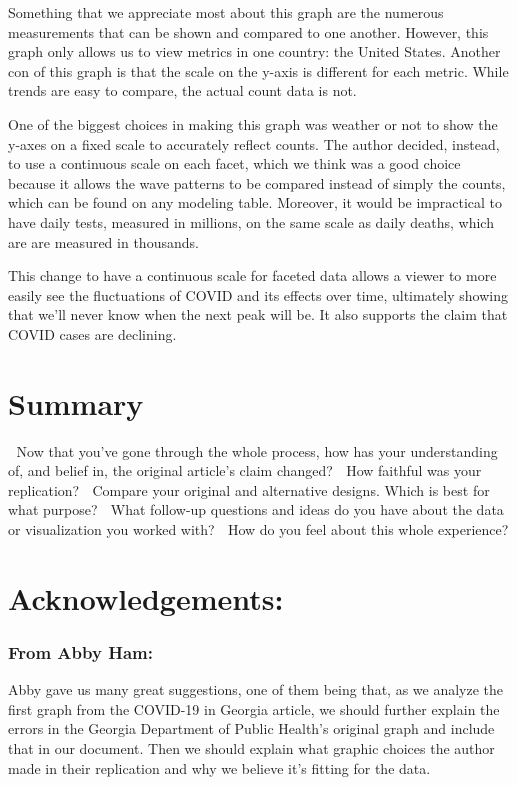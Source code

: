 \documentclass[
]{article}
\begin{document}
Something that we appreciate most about this graph are the numerous
measurements that can be shown and compared to one another. However,
this graph only allows us to view metrics in one country: the United
States. Another con of this graph is that the scale on the y-axis is
different for each metric. While trends are easy to compare, the actual
count data is not.

One of the biggest choices in making this graph was weather or not to
show the y-axes on a fixed scale to accurately reflect counts. The
author decided, instead, to use a continuous scale on each facet, which
we think was a good choice because it allows the wave patterns to be
compared instead of simply the counts, which can be found on any
modeling table. Moreover, it would be impractical to have daily tests,
measured in millions, on the same scale as daily deaths, which are are
measured in thousands.

This change to have a continuous scale for faceted data allows a viewer
to more easily see the fluctuations of COVID and its effects over time,
ultimately showing that we'll never know when the next peak will be. It
also supports the claim that COVID cases are declining.

\hypertarget{summary}{%
\section{Summary}\label{summary}}

🚧 Now that you've gone through the whole process, how has your
understanding of, and belief in, the original article's claim changed?
🚧 How faithful was your replication? 🚧 Compare your original and
alternative designs. Which is best for what purpose? 🚧 What follow-up
questions and ideas do you have about the data or visualization you
worked with? 🚧 How do you feel about this whole experience?

\hypertarget{acknowledgements}{%
\section{Acknowledgements:}\label{acknowledgements}}

\hypertarget{from-abby-ham}{%
\subsubsection{From Abby Ham:}\label{from-abby-ham}}

Abby gave us many great suggestions, one of them being that, as we
analyze the first graph from the COVID-19 in Georgia article, we should
further explain the errors in the Georgia Department of Public Health's
original graph and include that in our document. Then we should explain
what graphic choices the author made in their replication and why we
believe it's fitting for the data.
\end{document}
